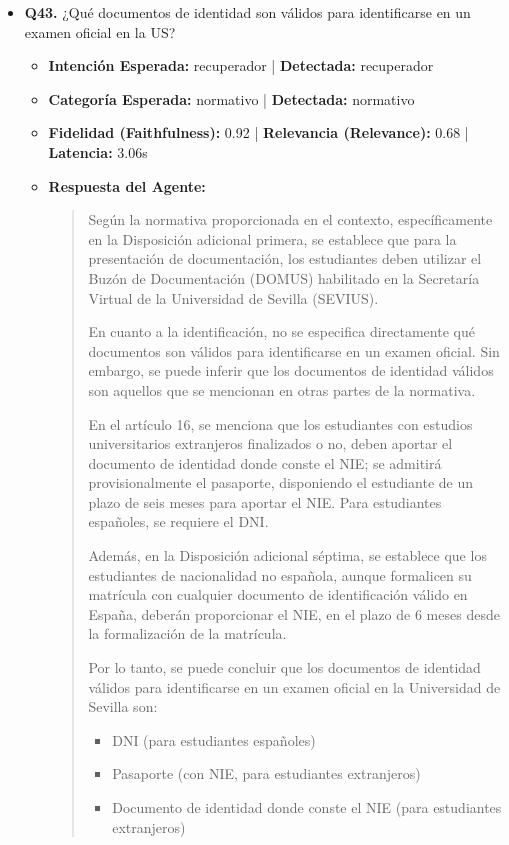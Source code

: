 \documentclass[12pt,a4paper,oneside]{report}
\begin{document}
\begin{itemize}
  
\item \textbf{Q43.} ¿Qué documentos de identidad son válidos para identificarse en un examen oficial en la US? \\
        \begin{itemize}
          \item \textbf{Intención Esperada:} recuperador | \textbf{Detectada:} recuperador
          \item \textbf{Categoría Esperada:} normativo | \textbf{Detectada:} normativo
          \item \textbf{Fidelidad (Faithfulness):} 0.92 | \textbf{Relevancia (Relevance):} 0.68 | \textbf{Latencia:} 3.06s
          \item \textbf{{Respuesta del Agente:}} \\
                \begin{quote}
Según la normativa proporcionada en el contexto, específicamente en la Disposición adicional primera, se establece que para la presentación de documentación, los estudiantes deben utilizar el Buzón de Documentación (DOMUS) habilitado en la Secretaría Virtual de la Universidad de Sevilla (SEVIUS).

En cuanto a la identificación, no se especifica directamente qué documentos son válidos para identificarse en un examen oficial. Sin embargo, se puede inferir que los documentos de identidad válidos son aquellos que se mencionan en otras partes de la normativa.

En el artículo 16, se menciona que los estudiantes con estudios universitarios extranjeros finalizados o no, deben aportar el documento de identidad donde conste el NIE; se admitirá provisionalmente el pasaporte, disponiendo el estudiante de un plazo de seis meses para aportar el NIE. Para estudiantes españoles, se requiere el DNI.

Además, en la Disposición adicional séptima, se establece que los estudiantes de nacionalidad no española, aunque formalicen su matrícula con cualquier documento de identificación válido en España, deberán proporcionar el NIE, en el plazo de 6 meses desde la formalización de la matrícula.

Por lo tanto, se puede concluir que los documentos de identidad válidos para identificarse en un examen oficial en la Universidad de Sevilla son:

\begin{itemize}
  \item DNI (para estudiantes españoles)
  \item Pasaporte (con NIE, para estudiantes extranjeros)
  \item Documento de identidad donde conste el NIE (para estudiantes extranjeros)
\end{itemize}


\end{quote}
\end{itemize}
\end{itemize}
\end{document}
